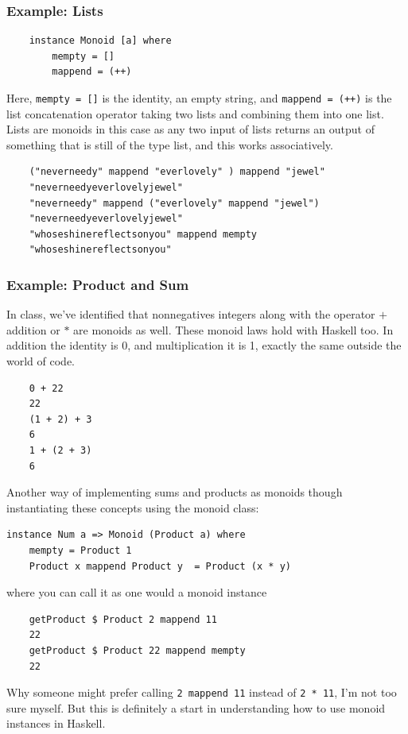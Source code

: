 \subsubsection{Example: Lists} 
\begin{lstlisting}
    instance Monoid [a] where 
        mempty = []
        mappend = (++)
\end{lstlisting}
Here, \lstinline{mempty = []} is the identity, an empty string, and \lstinline{mappend = (++)} is the list concatenation operator taking two lists and combining them into one list. Lists are monoids in this case as any two input of lists returns an output of something that is still of the type list, and this works associatively.
\begin{lstlisting}
    ("neverneedy" mappend "everlovely" ) mappend "jewel"
    "neverneedyeverlovelyjewel"
    "neverneedy" mappend ("everlovely" mappend "jewel")
    "neverneedyeverlovelyjewel"
    "whoseshinereflectsonyou" mappend mempty
    "whoseshinereflectsonyou"
\end{lstlisting}

\subsubsection{Example: Product and Sum}

In class, we've identified that nonnegatives integers along with the operator $+$ addition or $*$ are monoids as well. These monoid laws hold with Haskell too. In addition the identity is 0, and multiplication it is 1, exactly the same outside the world of code.
\begin{lstlisting}
    0 + 22
    22
    (1 + 2) + 3
    6
    1 + (2 + 3)
    6
\end{lstlisting}

Another way of implementing sums and products as monoids though instantiating these concepts using the monoid class:
\begin{lstlisting}
instance Num a => Monoid (Product a) where
    mempty = Product 1
    Product x mappend Product y  = Product (x * y)
\end{lstlisting}
where you can call it as one would a monoid instance
\begin{lstlisting}
    getProduct $ Product 2 mappend 11
    22
    getProduct $ Product 22 mappend mempty
    22
\end{lstlisting}
Why someone might prefer calling \lstinline{2 mappend 11} instead of \lstinline{2 * 11}, I'm not too sure myself. But this is definitely a start in understanding how to use monoid instances in Haskell. 

